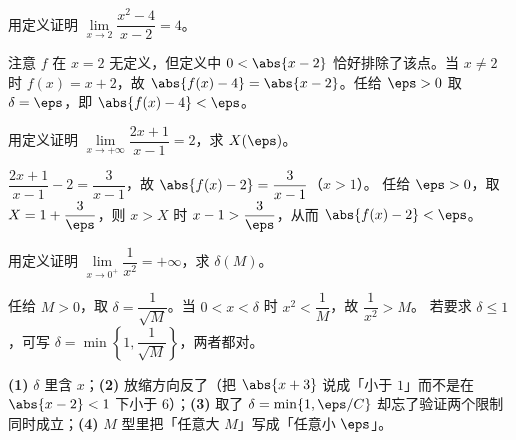 \documentclass[11pt,a4paper]{ctexart}
\begin{document}
\begin{exa}
用定义证明 $\lim\limits_{x\to2}\dfrac{x^2-4}{x-2}=4$。
\end{exa}
\begin{solution}
注意 $f$ 在 $x=2$ 无定义，但定义中 $0<\abs{x-2}$ 恰好排除了该点。当 $x\ne2$ 时
$f(x)=x+2$，故 $\abs{f(x)-4}=\abs{x-2}$。任给 $\eps>0$ 取 $\delta=\eps$，即 $\abs{f(x)-4}<\eps$。
\end{solution}

\begin{exa}[$\eps$-$X$ 型]
用定义证明 $\lim\limits_{x\to+\infty}\dfrac{2x+1}{x-1}=2$，求 $X(\eps)$。
\end{exa}
\begin{solution}
$\dfrac{2x+1}{x-1}-2=\dfrac{3}{x-1}$，故 $\abs{f(x)-2}=\dfrac{3}{x-1}$（$x>1$）。
任给 $\eps>0$，取 $X=1+\dfrac{3}{\eps}$，则 $x>X$ 时 $x-1>\dfrac{3}{\eps}$，从而 $\abs{f(x)-2}<\eps$。
\end{solution}

\begin{exa}[$M$ 型（无穷大）]
用定义证明 $\lim\limits_{x\to0^+}\dfrac{1}{x^2}=+\infty$，求 $\delta(M)$。
\end{exa}
\begin{solution}
任给 $M>0$，取 $\delta=\dfrac{1}{\sqrt{M}}$。当 $0<x<\delta$ 时 $x^2<\dfrac1M$，故 $\dfrac1{x^2}>M$。
若要求 $\delta\le1$，可写 $\delta=\min\left\{1,\dfrac{1}{\sqrt{M}}\right\}$，两者都对。
\end{solution}

\begin{warnbox}[量词写错的四种典型]
\textbf{(1)} $\delta$ 里含 $x$；\textbf{(2)} 放缩方向反了（把 $\abs{x+3}$ 说成「小于 $1$」而不是在 $\abs{x-2}<1$ 下小于 $6$）；\textbf{(3)} 取了 $\delta=\min\{1,\eps/C\}$ 却忘了验证两个限制同时成立；\textbf{(4)} $M$ 型里把「任意大 $M$」写成「任意小 $\eps$」。
\end{warnbox}
\end{document}
